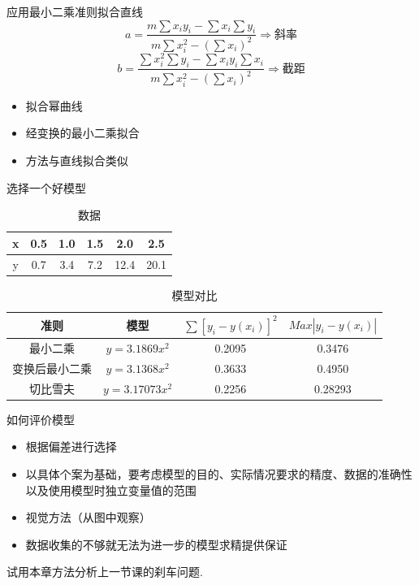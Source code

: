 \documentclass[UTF8]{ctexbeamer}
\begin{document}
\begin{frame}{应用最小二乘准则拟合直线}
  \[
  a = \frac{m\sum x_iy_i - \sum x_i\sum y_i}{m\sum x_i^2 -(\sum x_i)^2} \Rightarrow \text{斜率}
  \]
  \[
  b = \frac{\sum x_i^2\sum y_i - \sum x_iy_i\sum x_i}{m\sum x_i^2 -(\sum x_i)^2} \Rightarrow \text{截距}
  \]

  \begin{itemize}
  \item 拟合幂曲线
  \item 经变换的最小二乘拟合
  \item 方法与直线拟合类似
  \end{itemize}
  
\end{frame}

\begin{frame}{选择一个好模型}

  \begin{table}
    \centering{}
    \begin{tabular}{c|ccccc}
      x & 0.5 & 1.0 & 1.5 & 2.0 & 2.5\\
      \hline{}
      y & 0.7 & 3.4 & 7.2 & 12.4 & 20.1
    \end{tabular}
    \caption{数据}
  \end{table}

  \begin{table}
    \centering{}
    \begin{tabular}{cccc}
      准则 & 模型 & $\sum{}[y_i - y(x_i)]^2$ & $Max |y_i - y(x_i) |$\\
      \hline{}
      最小二乘 & $y=3.1869x^2$ & 0.2095 & 0.3476\\
      变换后最小二乘 & $y=3.1368x^2$ & 0.3633 & 0.4950\\
      切比雪夫 & $y=3.17073x^2$ & 0.2256 & 0.28293
    \end{tabular}
    \caption{模型对比}
  \end{table}

\end{frame}

\begin{frame}{如何评价模型}
  \begin{itemize}
  \item 根据偏差进行选择
  \item 以具体个案为基础，要考虑模型的目的、实际情况要求的精度、数据的准确性以及使用模型时独立变量值的范围
  \item 视觉方法（从图中观察）
  \item 数据收集的不够就无法为进一步的模型求精提供保证
  \end{itemize}

  试用本章方法分析上一节课的刹车问题.

\end{frame}
\end{document}
